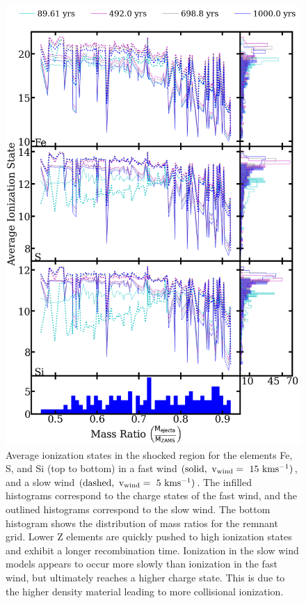 \documentclass[twocolumn]{aastex631}
\begin{document}
\begin{figure}[htb!]
    \centering
    \includegraphics[scale=0.19]{combo_ionization_combo.png}
    \caption{Average ionization states in the shocked region for the elements Fe, S, and Si (top to bottom) in a fast wind $(\rm solid,~v_{\rm wind}=~15~\rm kms^{-1})$, and a slow wind $(\rm dashed,~v_{\rm wind}=~5~\rm kms^{-1})$. The infilled histograms correspond to the charge states of the fast wind, and the outlined histograms correspond to the slow wind. The bottom histogram shows the distribution of mass ratios for the remnant grid. Lower Z elements are quickly pushed to high ionization states and exhibit a longer recombination time. Ionization in the slow wind models appears to occur more slowly than ionization in the fast wind, but ultimately reaches a higher charge state. This is due to the higher density material leading to more collisional ionization.}
    \label{fig:fast-ion-combo}
\end{figure}
\end{document}
